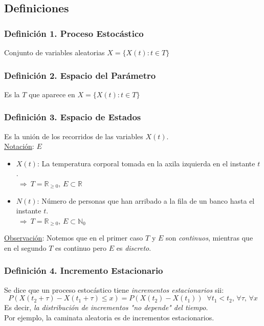 \documentclass{article}
\newcommand{\comma}{,\,}                                %
\newcommand{\naturales}{\mathbb{N}}                     %
\newcommand{\reales}{\mathbb{R}}                        %
\newcommand{\Rightarrows}{\: \Rightarrow \:}            %
\begin{document}
\subsection{Definiciones}
\subsubsection*{Definición 1. Proceso Estocástico}
Conjunto de variables aleatorias $X = \{ X(t) : t \in T\}$

\subsubsection*{Definición 2. Espacio del Parámetro}
Es la $T$ que aparece en $X = \{ X(t) : t \in T\}$

\subsubsection*{Definición 3. Espacio de Estados}
Es la unión de los recorridos de las variables $X(t)$. 
\\\underline{Notación}: $E$

\begin{tcolorbox}[title=Ejemplos]
\begin{itemize}
    \item  $X(t)$: La temperatura corporal tomada en la axila izquierda en el instante $t$.
    \\$\Rightarrows T = \reales_{\geq 0} \comma E \subset \reales$
    \item $N(t)$: Número de personas que han arribado a la fila de un banco hasta el instante $t$.
    \\$\Rightarrows T = \reales_{\geq 0} \comma E \subset \naturales_0$
\end{itemize}
\underline{Observación}: Notemos que en el primer caso $T$ y $E$ son \emph{continuos}, mientras que en el segundo $T$ es continuo pero $E$ es \emph{discreto}.
\end{tcolorbox}

\subsubsection*{Definición 4. Incremento Estacionario}
Se dice que un proceso estocástico tiene \emph{incrementos estacionarios} sii:
\begin{equation*}
    P(X(t_2 + \tau) - X(t_1 + \tau) \leq x) = P(X(t_2) - X(t_1  )) \;\; \forall t_1 < t_2 \comma \forall \tau \comma \forall x
\end{equation*}
Es decir, \emph{la distribución de incrementos "no depende" del tiempo}.
\\Por ejemplo, la caminata aleatoria es de incrementos estacionarios.
\end{document}
